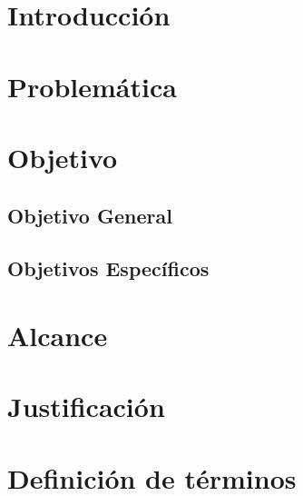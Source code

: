 \section{Introducción}

\section{Problemática}

\section{Objetivo}

\subsection{Objetivo General}

\subsection{Objetivos Específicos}

\section{Alcance}

\section{Justificación}

\section{Definición de términos}